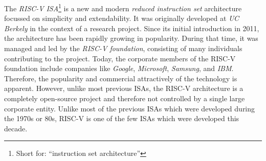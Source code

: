 %
%

\newpage

The \emph{RISC-V} \emph{ISA}\footnote{Short for: \enquote{instruction set architecture}} is a new and modern \emph{reduced instruction set} architecture focussed on simplicity and extendability.
It was originally developed at \emph{UC Berkely} in the context of a research project.
Since its initial introduction in 2011, the architecture has been rapidly growing in popularity.
During that time, it was managed and led by the \emph{RISC-V foundation}, consisting of many individuals contributing to the project.
Today, the corporate members of the RISC-V foundation include companies like \emph{Google}, \emph{Microsoft}, \emph{Samsung}, and \emph{IBM}.
Therefore, the popularity and commercial attractively of the technology is apparent.
However, unlike most previous ISAs, the RISC-V architecture is a completely open-source project and therefore not controlled by a single large corporate entity.
Unlike most of the previous ISAs which were developed during the 1970s or 80s, RISC-V is one of the few ISAs which were developed this decade.

